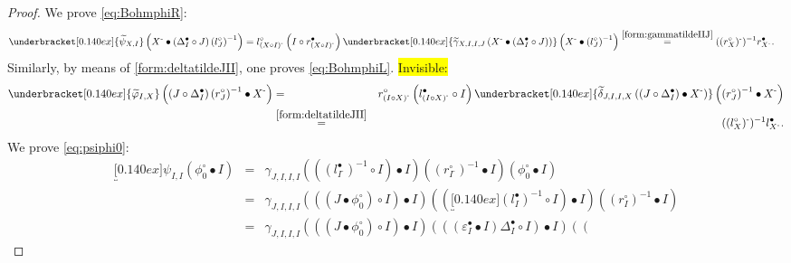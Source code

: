 \documentclass[nosumlimits,twoside]{amsart}
\theoremstyle{definition}
\theoremstyle{remark}
\def\revsn{\text{-}}
\newenvironment{invisible}{{\noindent\sc \colorbox{yellow}{Invisible:}\;}\color{gray}}{\medskip}
\begin{document}
\begin{proof} We prove \eqref{eq:BohmphiR}:
    \begin{align*}
\underbracket[0.140ex]{\widetilde{\psi }_{X,I}}%
\left( X^{\revsn }\bullet \left( \Delta _{I}^{\bullet }\circ J\right) \left(
l_{J}^{\circ }\right) ^{-1}\right) &=l_{\left( X\circ I\right) ^{\revsn
}}^{\circ }\left( I\circ r_{\left( X\circ I\right) ^{\revsn }}^{\bullet
}\right) \underbracket[0.140ex]{\widetilde{\gamma }_{X,I,I,J}\left( X^{\revsn }\bullet
\left( \Delta _{I}^{\bullet }\circ J\right) \right) }\left( X^{\revsn }\bullet
\left( l_{J}^{\circ }\right) ^{-1}\right)\overset{\eqref{form:gammatildeIIJ}}{=}((r_X^\circ)^\revsn)^{-1}r_{X^\revsn}^\bullet.
\end{align*}%
Similarly, by means of \eqref{form:deltatildeJII}, one proves \eqref{eq:BohmphiL}.
\begin{invisible}
    \begin{eqnarray*}
\underbracket[0.140ex]{\widetilde{\varphi }%
_{I,X}}\left( \left( J\circ \Delta _{I}^{\bullet }\right) \left(
r_{J}^{\circ }\right) ^{-1}\bullet X^{\revsn }\right) 
&=& r_{\left( I\circ X\right) ^{\revsn
}}^{\circ }\left( l_{\left( I\circ X\right) ^{\revsn }}^{\bullet }\circ
I\right) \underbracket[0.140ex]{\widetilde{\delta }_{J,I,I,X}\left( \left( J\circ
\Delta _{I}^{\bullet }\right) \bullet X^{\revsn }\right) }\left( \left(
r_{J}^{\circ }\right) ^{-1}\bullet X^{\revsn }\right) \\&\overset{\eqref{form:deltatildeJII}}{=}&((l_X^\circ)^\revsn)^{-1}l_{X^\revsn}^\bullet.
\end{eqnarray*}
\end{invisible}
We prove \eqref{eq:psiphi0}:
\begin{eqnarray*}
\underbracket[0.140ex]{\psi _{I,I}}\left( \phi _{0}^{\circ}\bullet I\right) 
&=&\gamma
_{J,I,I,I}\left( \left( \left( l_{I^{\revsn }}^{\bullet }\right) ^{-1}\circ
I\right) \bullet I\right) \left( \left( r_{I^{\revsn }}^{\circ }\right)
^{-1}\bullet I\right) \left( \phi _{0}^{\circ}\bullet I\right) 
\\
&=&\gamma
_{J,I,I,I}\left( \left( \left( J\bullet \phi _{0}^{\circ}\right) \circ I\right)
\bullet I\right) \left( \left( \underbracket[0.140ex]{\left( l_{I}^{\bullet }\right)
^{-1}}\circ I\right) \bullet I\right) \left( \left( r_{I}^{\circ }\right)
^{-1}\bullet I\right)  \\
&=& \gamma
_{J,I,I,I}\left( \left( \left( J\bullet \phi _{0}^{\circ}\right) \circ I\right)
\bullet I\right) \left( \left( \left( \varepsilon _{I}^{\bullet }\bullet
I\right) \Delta _{I}^{\bullet }\circ I\right) \bullet I\right) \left( \left(

\end{eqnarray*}
\end{proof}
\end{document}
